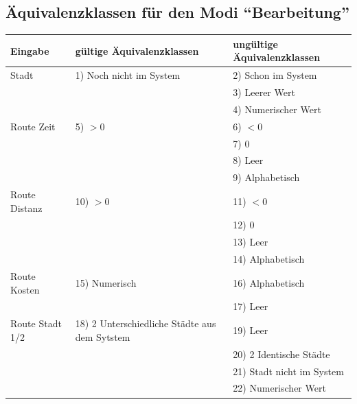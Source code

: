 \documentclass[a4paper]{report}
\begin{document}
\subsection*{Äquivalenzklassen für den Modi ``Bearbeitung''}
\begin{tabular}{|l|l|l|}
\hline
    Eingabe 	& gültige Äquivalenzklassen 	& ungültige Äquivalenzklassen\\
    \hline
Stadt 		& 1) Noch nicht im System 	& 2) Schon im System \\
		& 				& 3) Leerer Wert \\
		& 				& 4) Numerischer Wert \\
\hline
Route Zeit 	& 5) $>0$ 			& 6) $<0$\\
		&  				& 7) $0$\\
		&  				& 8) Leer \\
		& 				& 9) Alphabetisch \\
\hline
Route Distanz 	& 10) $>0$ 			& 11) $<0$\\
		&  				& 12) $0$\\
		&  				& 13) Leer \\
		& 				& 14) Alphabetisch \\
\hline
Route Kosten 	& 15) Numerisch 		& 16) Alphabetisch \\
		&  				& 17) Leer \\
\hline
Route Stadt 1/2 & 18) 2 Unterschiedliche Städte aus dem Sytstem & 19) Leer \\
		&  						& 20) 2 Identische Städte\\
		&  						& 21) Stadt nicht im System \\
		&  						& 22) Numerischer Wert \\ 
\hline
\end{tabular}
\end{document}
